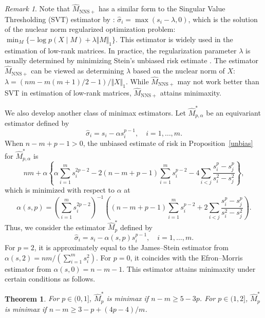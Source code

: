\documentclass[11pt, a4paper]{article}
\newtheorem{theorem}{Theorem}
\theoremstyle{remark}
\newtheorem{remark}{Remark}
\begin{document}
\begin{remark}
Note that $\hat{M}_{\mathrm{NNS+}}$ has a similar form to the Singular Value Thresholding (SVT) estimator by \cite{cai2010singular}:
$\hat\sigma_i=\max( s_i-\lambda, 0)$, which is the solution of the nuclear norm regularized optimization problem:
$\min_M \{-\log p(X\mid M)+\lambda\Vert M\Vert_1\}.$
This estimator is widely used in the estimation of low-rank matrices. 
In practice, the regularization parameter $\lambda$ is usually determined by minimizing Stein's unbiased risk estimate \citep{candes2013unbiased}. 
The estimator $\hat{M}_{\mathrm{NNS+}}$ can be viewed as determining $\lambda$ based on the nuclear norm of $X$: $\lambda=(nm-m(m+1)/2-1)/\Vert X\Vert_1$.
While $\hat{M}_{\mathrm{NNS+}}$ may not work better than SVT in estimation of low-rank matrices, $\hat{M}_{\mathrm{NNS+}}$ attains minimaxity.
\end{remark}



We also develop another class of minimax estimators.
Let $\hat{M}^*_{p,\alpha}$ be an equivariant estimator defined by
\[
\hat\sigma_i= s_i-\alpha s_i^{p-1}, \quad i=1,\dots,m.
\]
When $n-m+p-1>0$, the unbiased estimate of risk in Proposition~\ref{unbias} for $\hat{M}^*_{p,\alpha}$ is
\begin{equation*}
    nm+\alpha\left\{\alpha\sum_{i=1}^m s_i^{2p-2}-2(n-m+p-1)\sum_{i=1}^m s_i^{p-2}-4\sum_{i<j}\frac{ s_i^p- s_j^p}{ s_i^2- s_j^2}\right\},
\end{equation*}
which is minimized with respect to $\alpha$ at 
\begin{equation}
\alpha( s,p)= \left( \sum_{i=1}^m s_i^{2p-2} \right)^{-1} \left( (n-m+p-1)\sum_{i=1}^m s_i^{p-2}+2\sum_{i<j}\frac{ s_i^p- s_j^p}{ s_i^2- s_j^2} \right). \label{alpha_opt}
\end{equation}
Thus, we consider the estimator $\hat{M}^*_p$ defined by
\[
\hat\sigma_i= s_i-\alpha( s,p)  s_i^{p-1}, \quad i=1,\dots,m.
\]
For $p=2$, it is approximately equal to the James--Stein estimator from $\alpha( s,2)=nm/(\sum_{i=1}^m s_i^2)$. 
For $p=0$, it coincides with the Efron--Morris estimator from $\alpha( s,0)=n-m-1$. 
This estimator attains minimaxity under certain conditions as follows.

\begin{theorem} \label{sure-minimax}
   For $p\in(0,1]$, $\hat{M}^*_p$ is minimax if $n-m\ge5-3p$. For $p\in(1,2]$, $\hat{M}^*_p$ is minimax if $n-m\ge 3-p+(4p-4)/m$.
\end{theorem}
\end{document}

